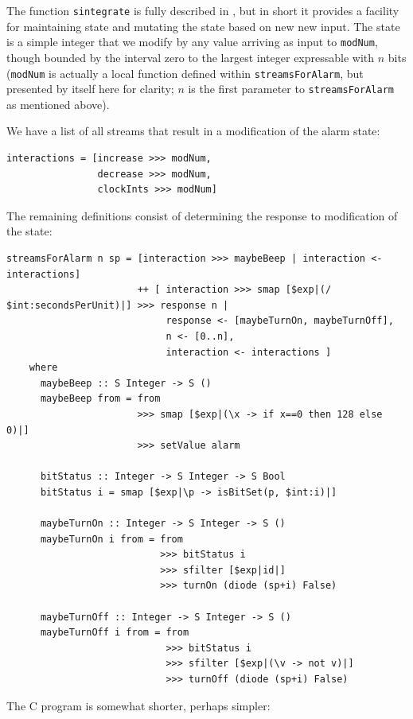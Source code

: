 \documentclass[a4paper, oneside, final]{memoir}
\let\Fref\undefined
\begin{document}
The function \texttt{sintegrate} is fully described in
\Fref{sec:streamoperators}, but in short it provides a facility for
maintaining state and mutating the state based on new new input.  The
state is a simple integer that we modify by any value arriving as
input to \texttt{modNum}, though bounded by the interval zero to the
largest integer expressable with $n$ bits (\texttt{modNum} is actually
a local function defined within \texttt{streamsForAlarm}, but
presented by itself here for clarity; $n$ is the first parameter to
\texttt{streamsForAlarm} as mentioned above).

We have a list of all streams that result in a modification of the
alarm state:

\begin{verbatim}
interactions = [increase >>> modNum,
                decrease >>> modNum,
                clockInts >>> modNum]
\end{verbatim}

The remaining definitions consist of determining the response to
modification of the state:

\begin{verbatim}
streamsForAlarm n sp = [interaction >>> maybeBeep | interaction <- interactions]
                       ++ [ interaction >>> smap [$exp|(/ $int:secondsPerUnit)|] >>> response n | 
                            response <- [maybeTurnOn, maybeTurnOff],
                            n <- [0..n],
                            interaction <- interactions ]
    where
      maybeBeep :: S Integer -> S ()
      maybeBeep from = from
                       >>> smap [$exp|(\x -> if x==0 then 128 else 0)|]
                       >>> setValue alarm

      bitStatus :: Integer -> S Integer -> S Bool
      bitStatus i = smap [$exp|\p -> isBitSet(p, $int:i)|]

      maybeTurnOn :: Integer -> S Integer -> S ()
      maybeTurnOn i from = from 
                           >>> bitStatus i 
                           >>> sfilter [$exp|id|] 
                           >>> turnOn (diode (sp+i) False)

      maybeTurnOff :: Integer -> S Integer -> S ()
      maybeTurnOff i from = from 
                            >>> bitStatus i 
                            >>> sfilter [$exp|(\v -> not v)|]
                            >>> turnOff (diode (sp+i) False)
\end{verbatim}

The C program is somewhat shorter, perhaps simpler:
\end{document}
